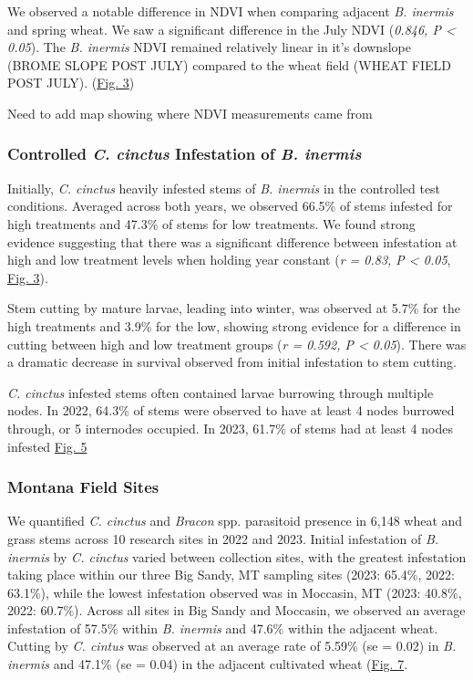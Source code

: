 \documentclass[
]{article}
\begin{document}
We observed a notable difference in NDVI when comparing adjacent
\emph{B. inermis} and spring wheat. We saw a significant difference in
the July NDVI (\emph{0.846, P \textless{} 0.05}). The \emph{B. inermis}
NDVI remained relatively linear in it's downslope (BROME SLOPE POST
JULY) compared to the wheat field (WHEAT FIELD POST JULY).
(\hyperref[figure3]{Fig. 3})

Need to add map showing where NDVI measurements came from

\subsubsection{\texorpdfstring{Controlled \emph{C. cinctus} Infestation
of \emph{B.
inermis}}{Controlled C. cinctus Infestation of B. inermis}}\label{controlled-c.-cinctus-infestation-of-b.-inermis-1}

Initially, \emph{C. cinctus} heavily infested stems of \emph{B. inermis}
in the controlled test conditions. Averaged across both years, we
observed 66.5\% of stems infested for high treatments and 47.3\% of
stems for low treatments. We found strong evidence suggesting that there
was a significant difference between infestation at high and low
treatment levels when holding year constant (\emph{r = 0.83, P
\textless{} 0.05}, \hyperref[figure4]{Fig. 3}).

Stem cutting by mature larvae, leading into winter, was observed at
5.7\% for the high treatments and 3.9\% for the low, showing strong
evidence for a difference in cutting between high and low treatment
groups (\emph{r = 0.592, P \textless{} 0.05}). There was a dramatic
decrease in survival observed from initial infestation to stem cutting.

\emph{C. cinctus} infested stems often contained larvae burrowing
through multiple nodes. In 2022, 64.3\% of stems were observed to have
at least 4 nodes burrowed through, or 5 internodes occupied. In 2023,
61.7\% of stems had at least 4 nodes infested \hyperref[figure5]{Fig. 5}

\subsubsection{Montana Field Sites}\label{montana-field-sites}

We quantified \emph{C. cinctus} and \emph{Bracon} spp. parasitoid
presence in 6,148 wheat and grass stems across 10 research sites in 2022
and 2023. Initial infestation of \emph{B. inermis} by \emph{C. cinctus}
varied between collection sites, with the greatest infestation taking
place within our three Big Sandy, MT sampling sites (2023: 65.4\%, 2022:
63.1\%), while the lowest infestation observed was in Moccasin, MT
(2023: 40.8\%, 2022: 60.7\%). Across all sites in Big Sandy and
Moccasin, we observed an average infestation of 57.5\% within \emph{B.
inermis} and 47.6\% within the adjacent wheat. Cutting by \emph{C.
cintus} was observed at an average rate of 5.59\% (se = 0.02) in
\emph{B. inermis} and 47.1\% (se = 0.04) in the adjacent cultivated
wheat (\hyperref[figure7]{Fig. 7}.
\end{document}
